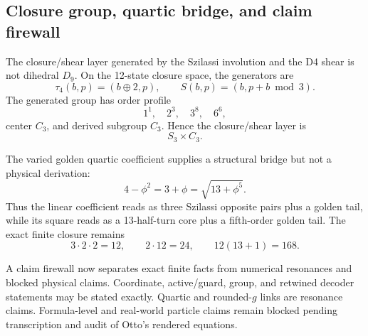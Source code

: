 \subsection{Closure group, quartic bridge, and claim firewall}
\label{sec:bt1453-bt1455-group-quartic-firewall}

The closure/shear layer generated by the Szilassi involution and the D4 shear is
not dihedral \(D_9\).  On the 12-state closure space, the generators are
\[
\tau_4(b,p)=(b\oplus2,p),
\qquad
S(b,p)=(b,p+b\bmod3).
\]
The generated group has order profile
\[
1^1,\quad2^3,\quad3^8,\quad6^6,
\]
center \(C_3\), and derived subgroup \(C_3\).  Hence the closure/shear layer is
\[
S_3\times C_3.
\]

The varied golden quartic coefficient supplies a structural bridge but not a
physical derivation:
\[
4-\phi^2=3+\phi=\sqrt{13+\phi^5}.
\]
Thus the linear coefficient reads as three Szilassi opposite pairs plus a golden
tail, while its square reads as a 13-half-turn core plus a fifth-order golden
tail.  The exact finite closure remains
\[
3\cdot2\cdot2=12,\qquad 2\cdot12=24,\qquad12(13+1)=168.
\]

A claim firewall now separates exact finite facts from numerical resonances and
blocked physical claims.  Coordinate, active/guard, group, and retwined decoder
statements may be stated exactly.  Quartic and rounded-\(g\) links are resonance
claims.  Formula-level and real-world particle claims remain blocked pending
transcription and audit of Otto's rendered equations.
